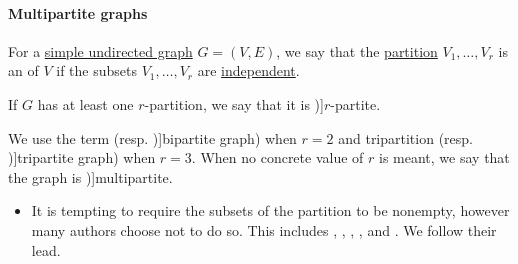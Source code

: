 \paragraph{Multipartite graphs}

\begin{definition}\label{def:multipartite_graph}
  For a \hyperref[def:undirected_graph]{simple undirected graph} \( G = (V, E) \), we say that the \hyperref[def:set_partition]{partition} \( V_1, \ldots, V_r \) is an  of \( V \) if the subsets \( V_1, \ldots, V_r \) are \hyperref[def:graph_independent_set]{independent}.

  If \( G \) has at least one \( r \)-partition, we say that it is \term[ru=\( r \)-дольный (граф) (\cite[11]{ЕмеличевИПр1990ТеорияГрафов})]{\( r \)-partite}.

  We use the term  (resp. \term[ru=двудольный (граф) (\cite[11]{ЕмеличевИПр1990ТеорияГрафов})]{bipartite graph}) when \( r = 2 \) and tripartition (resp. \term[ru=трёхдольный (граф) (\cite[11]{ЕмеличевИПр1990ТеорияГрафов})]{tripartite graph}) when \( r = 3 \). When no concrete value of \( r \) is meant, we say that the graph is \term[en=multipartite (graph) (\cite[ex. 8.5.5]{Knauer2019AlgebraicGraphTheory})]{multipartite}.
\end{definition}
\begin{itemize}
  \item It is tempting to require the subsets of the partition to be nonempty, however many authors choose not to do so. This includes , , , ,  and . We follow their lead.
\end{itemize}

